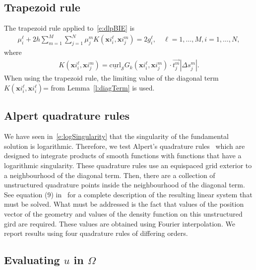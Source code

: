 \documentclass[final]{siamltex}
\renewcommand{\S} {\mathcal{S}}
\begin{document}
\subsection{Trapezoid rule}

The trapezoid rule applied to~\eqref{e:dlpBIE} is 
\begin{align}
  \label{e:trapRule}
  \mu_{i}^{\ell} + 2h \sum_{m=1}^{M} \sum_{j=1}^{N}
    \mu_{j}^{m} K({\mathbf x}i_{i}^{\ell},{\mathbf x}i_{j}^{m}) = 2g_{i}^{\ell}, \quad
      \ell=1,\ldots,M,i=1,\ldots,N,
\end{align}
where
\begin{align*}
  K({\mathbf x}i_{i}^{\ell},{\mathbf x}i_{j}^{m}) =\underline{\mbox{curl}}_{\S}G_{k}
    ({\mathbf x}i_{i}^{\ell},{\mathbf x}i_{j}^{m}) \cdot \vec{t_{j}^{m}} |\Delta s_{j}^{m}|.
\end{align*}
When using the trapezoid rule, the limiting value of the diagonal term
$K({\mathbf x}i_{i}^{\ell},{\mathbf x}i_{i}^{\ell})$= from
Lemma~\ref{l:diagTerm} is used. \\


\subsection{Alpert quadrature rules}

We have seen in~\eqref{e:logSingularity} that the singularity of the
fundamental solution is logarithmic.  Therefore, we test Alpert's
quadrature rules~\cite{alpert} which are designed to integrate products
of smooth functions with functions that have a logarithmic singularity.
These quadrature rules use an equispaced grid exterior to a neighbourhood
of the diagonal term.  Then, there are a collection of unstructured
quadrature points inside the neighbourhood of the diagonal term.  See
equation (9) in~\cite{kro:qua2011} for a complete description of the
resulting linear system that must be solved.  What must be addressed is
the fact that values of the position vector of the geometry and values
of the density function on this unstructured gird are required.  These
values are obtained using Fourier interpolation.  We report results
using four quadrature rules of differing orders.


\subsection{Evaluating $u$ in $\Omega$}
\end{document}
